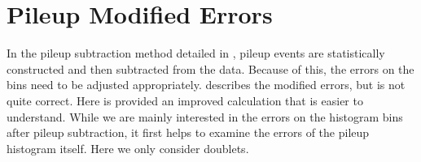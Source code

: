 
\thispagestyle{myheadings}

\chapter{Pileup Modified Errors}
\label{PileupErrors}

In the pileup subtraction method detailed in , pileup events are statistically constructed and then subtracted from the data. Because of this, the errors on the bins need to be adjusted appropriately.  describes the modified errors, but is not quite correct. Here is provided an improved calculation that is easier to understand. While we are mainly interested in the errors on the histogram bins after pileup subtraction, it first helps to examine the errors of the pileup histogram itself. Here we only consider doublets.


